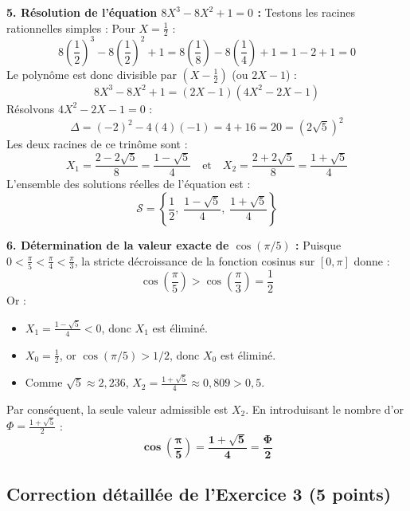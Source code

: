 \documentclass[11pt,a4paper]{article}
\begin{document}
\begin{correctionbox}
\textbf{5. Résolution de l'équation $8X^3 - 8X^2 + 1 = 0$ :}
Testons les racines rationnelles simples :
Pour $X = \frac{1}{2}$ :
\[
8\left(\frac{1}{2}\right)^3 - 8\left(\frac{1}{2}\right)^2 + 1 = 8\left(\frac{1}{8}\right) - 8\left(\frac{1}{4}\right) + 1 = 1 - 2 + 1 = 0
\]
Le polynôme est donc divisible par $\left(X - \frac{1}{2}\right)$ (ou $2X - 1$) :
\[
8X^3 - 8X^2 + 1 = (2X - 1)(4X^2 - 2X - 1)
\]
Résolvons $4X^2 - 2X - 1 = 0$ :
\[
\Delta = (-2)^2 - 4(4)(-1) = 4 + 16 = 20 = (2\sqrt{5})^2
\]
Les deux racines de ce trinôme sont :
\[
X_1 = \frac{2 - 2\sqrt{5}}{8} = \frac{1 - \sqrt{5}}{4} \quad \text{et} \quad X_2 = \frac{2 + 2\sqrt{5}}{8} = \frac{1 + \sqrt{5}}{4}
\]
L'ensemble des solutions réelles de l'équation est :
\[
\mathcal{S} = \left\{ \frac{1}{2}, \; \frac{1 - \sqrt{5}}{4}, \; \frac{1 + \sqrt{5}}{4} \right\}
\]

\textbf{6. Détermination de la valeur exacte de $\cos(\pi/5)$ :}
Puisque $0 < \frac{\pi}{5} < \frac{\pi}{4} < \frac{\pi}{3}$, la stricte décroissance de la fonction cosinus sur $[0, \pi]$ donne :
\[
\cos\left(\frac{\pi}{5}\right) > \cos\left(\frac{\pi}{3}\right) = \frac{1}{2}
\]
Or :
\begin{itemize}[label=$\bullet$]
    \item $X_1 = \frac{1 - \sqrt{5}}{4} < 0$, donc $X_1$ est éliminé.
    \item $X_0 = \frac{1}{2}$, or $\cos(\pi/5) > 1/2$, donc $X_0$ est éliminé.
    \item Comme $\sqrt{5} \approx 2{,}236$, $X_2 = \frac{1 + \sqrt{5}}{4} \approx 0{,}809 > 0{,}5$.
\end{itemize}
Par conséquent, la seule valeur admissible est $X_2$. En introduisant le nombre d'or $\Phi = \frac{1+\sqrt{5}}{2}$ :
\[
\mathbf{\cos\left(\frac{\pi}{5}\right) = \frac{1 + \sqrt{5}}{4} = \frac{\Phi}{2}}
\]
\end{correctionbox}

\vspace{0.4cm}

\subsection*{Correction détaillée de l'Exercice 3 \hfill (5 points)}
\end{document}
